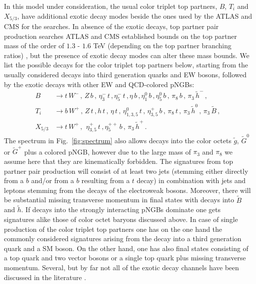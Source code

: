 \documentclass[preprintnumbers,nofootinbib,showpacs,eqsecnum,pre,12pt]{revtex4-1}
\begin{document}
In this model under consideration, the usual color triplet top partners, $B$, $T_i$  and $X_{5/3}$, have additional exotic decay modes \cite{Bizot:2018tds} beside the ones used by the ATLAS and CMS for the searches. In absence of the exotic decays, top partner pair production searches ATLAS and CMS established bounds on the top partner mass of the order of $1.3$ - $1.6$ TeV (depending on the top partner branching ratios) \cite{Aaboud:2017zfn,Aaboud:2017qpr,Aaboud:2018xuw,Aaboud:2018saj,Aaboud:2018xpj,Aaboud:2018wxv,Aaboud:2018pii,Sirunyan:2017pks,Sirunyan:2018qau,Sirunyan:2018omb,Sirunyan:2019sza,Sirunyan:2018yun,Sirunyan:2020qvb,Aaboud:2018ifs,Sirunyan:2017ynj,Sirunyan:2018fjh,Sirunyan:2018ncp,Sirunyan:2019xeh,ATLAS:2021ibc}, but the presence of exotic decay modes can alter these mass bounds.
We list the possible decays for the color triplet top partners below, starting from the usually considered decays into third generation quarks and EW bosons, followed by the exotic decays with other EW and QCD-colored pNGBs:
\begin{subequations}\begin{align}
B &\to t \, W^- \,,\, Z \, b \,,\, \eta^-_{3} \,t \,, \eta^-_5 \,t \,, \eta \, b  \,, \eta^0_1 \, b  \,, \eta^0_5 \, b \,,\, \pi_8 \, b  \,,\, \pi_3 \, \tilde h^-\,, \\
%
T_i &\to  b \, W^+ \,,\,Z \, t \,, h \, t \,,\,  \eta \, t \,,\, \eta^0_{1,3,5} \, t\,,\, \eta^+_{3,5} \, b\,,\,  \pi_8 \, t  \,,\, \pi_3 \, \tilde h^0 \,,\, \pi_3 \, \tilde B\,, \\
X_{5/3} &\to  t \, W^+ \,,\,\  \eta^+_{3,5} \, t \,, \eta^{++}_5 \, b \,,\, \pi_3 \, \tilde h^+ \,.
\end{align}\end{subequations}
The spectrum in Fig.~\ref{fig:spectrum} also allows decays into the color octets $\tilde g$, $\tilde G^0$ or $\tilde G^+$ plus a colored pNGB, however due to the large mass of $\pi_3$ and $\pi_8$ we assume here that they are kinematically forbidden.
The signatures from top partner pair production will consist of at least two
jets (stemming either directly from a $b$ and/or from a $b$ resulting from a $t$ decay)
in combination with jets and leptons stemming from the decays of the electroweak bosons. Moreover, there will be substantial missing transverse momentum in final states with decays into $\tilde B$ and $\tilde h$. 
If decays into the strongly interacting pNGBs dominate one gets signatures alike those of color octet baryons discussed above. 
In case of single production of the color triplet top partners one has on the one hand the commonly considered signatures arising from the decay into a third generation quark and a SM boson. On the other hand, one has also final states consisting of a top quark and two vector bosons or a single top quark plus missing transverse momentum.
Several, but by far not all of the exotic decay channels have been discussed in the literature \cite{Chala:2017xgc,Aguilar-Saavedra:2017giu,Bizot:2018tds,Han:2018hcu,Kim:2018mks,Alhazmi:2018whk,Xie:2019gya,Cacciapaglia:2019zmj,Benbrik:2019zdp,Aguilar-Saavedra:2019ghg,Wang:2020ips,Corcella:2021mdl}.
\end{document}
